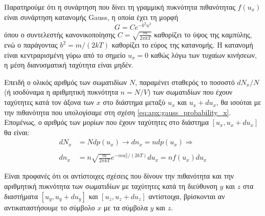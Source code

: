Παρατηρούμε ότι η συνάρτηση που δίνει τη γραμμική πυκνότητα πιθανότητας $f(u_x)$ είναι συνάρτηση κατανομής Gauss, η οποία έχει τη μορφή
\begin{equation}
    \label{eq:apx:gauss_formula}
    G = C e^{-b^2u^2}
\end{equation}
όπου ο συντελεστής κανονικοποίησης $C = \sqrt{\frac{m}{2\pi kT}}$ καθορίζει το ύψος της καμπύλης, ενώ ο παράγοντας $b^2 = m/(2kT)$ καθορίζει το εύρος της κατανομής. Η κατανομή είναι κεντραρισμένη γύρω από το σημείο $u_x = 0$ καθώς λόγω των τυχαίων κινήσεων, η μέση διανυσματική ταχύτητα είναι μηδέν.

Επειδή ο ολικός αριθμός των σωματιδίων $N$, παραμένει σταθερός το ποσοστό $dN_x/N$ (ή ισοδύναμα η αριθμητική πυκνότητα $n=N/V$) των σωματιδίων που έχουν ταχύτητες κατά τον άξονα των $x$ στο διάστημα μεταξύ $u_x$ και $u_x+du_x$, θα ισούται με την πιθανότητα που υπολογίσαμε στη σχέση \eqref{eq:apx:gauss_probability_x}. Επομένως, ο αριθμός των μορίων που έχουν ταχύτητες στο διάστημα $\left[u_x, u_x + du_x \right]$ θα είναι:
\begin{align}
    \label{eq:apx:number_density_x_axis}
    \nonumber dN_x &= N dp(u_x) \longrightarrow dn_x = n dp(u_x) \Rightarrow\\ \nonumber \\ 
     dn_x &= n \sqrt{\frac{m}{2\pi kT}} e^{-mu_x^2/(2kT)} du_x = n f(u_x) du_x
\end{align}

Είναι προφανές ότι οι αντίστοιχες σχέσεις που δίνουν την πιθανότητα και την αριθμητική πυκνότητα των σωματιδίων με ταχύτητες κατά τη διεύθυνση $y$ και $z$ στα διαστήματα $\left[u_y, u_y + du_y \right]$ και $\left[u_z, u_z + du_z \right]$ αντίστοιχα, βρίσκονται αν αντικαταστήσουμε το σύμβολο $x$ με τα σύμβολα $y$ και $z$.

